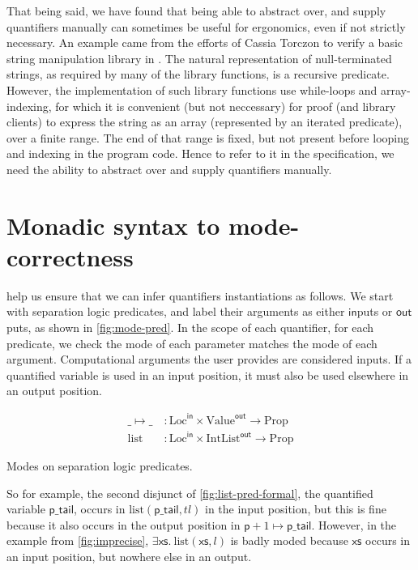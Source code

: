 That being said, we have found that being able to abstract over, and supply
quantifiers manually can sometimes be useful for ergonomics, even if not
strictly necessary. An example came from the efforts of Cassia Torczon to
verify a basic string manipulation library in .%
 The natural representation of null-terminated strings, as
required by many of the library functions, is a recursive predicate. However,
the implementation of such library functions use while-loops and
array-indexing, for which it is convenient (but not neccessary) for proof (and
library clients) to express the string as an array (represented by an iterated
predicate), over a finite range. The end of that range is fixed, but not
present before looping and indexing in the program code. Hence to refer to it
in the specification, we need the ability to abstract over and supply
quantifiers manually.

\section{Monadic syntax to mode-correctness}\label{sec:monadic-syntax}

 help us ensure that we can infer quantifiers instantiations
as follows. We start with separation logic predicates, and label their
arguments as either $\mathsf{in}$puts or $\mathsf{out}$puts, as shown in
\cref{fig:mode-pred}. In the scope of each quantifier, for each predicate, we
check the mode of each parameter matches the mode of each argument.
Computational arguments the user provides are considered inputs. If a
quantified variable is used in an input position, it must also be used
elsewhere in an output position.

\begin{marginfigure}
    \centering
    \small%
    \begin{align*}
        \_ \mapsto{} \_ \:&: \mathrm{Loc}^{\mathsf{in}} \times \mathrm{Value}^{\mathsf{out}} \rightarrow \mathrm{Prop} \\
        \mathrm{list} \:&: \mathrm{Loc}^{\mathsf{in}} \times \mathrm{IntList}^{\mathsf{out}} \rightarrow \mathrm{Prop}
    \end{align*}
    \caption{Modes on separation logic predicates.}\label{fig:mode-pred}
\end{marginfigure}

So for example, the second disjunct of \cref{fig:list-pred-formal}, the
quantified variable $\mathsf{p\_tail}$, occurs in $\mathrm{list}
(\mathsf{p\_tail}, {tl})$ in the input position, but this is fine because it also
occurs in the output position in $\mathsf{p} + 1 \mapsto{} \mathsf{p\_tail}$.
However, in the example from \cref{fig:imprecise}, $\exists \mathsf{xs}. \
\mathrm{list}(\mathsf{xs},l)$ is badly moded because $\mathsf{xs}$ occurs in an
input position, but nowhere else in an output.


